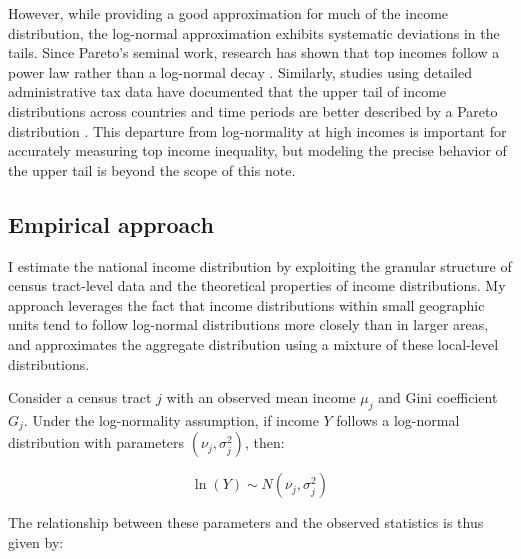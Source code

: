 However, while providing a good approximation for much of the income distribution, the log-normal approximation exhibits systematic deviations in the tails. Since Pareto's \citeyearpar{pareto1896cours} seminal work, research has shown that top incomes follow a power law rather than a log-normal decay \citep{gabaix2016power}. Similarly, studies using detailed administrative tax data have documented that the upper tail of income distributions across countries and time periods are better described by a Pareto distribution \citep{atkinson2011top}. This departure from log-normality at high incomes is important for accurately measuring top income inequality, but modeling the precise behavior of the upper tail is beyond the scope of this note.



\subsection{Empirical approach}

I estimate the national income distribution by exploiting the granular structure of census tract-level data and the theoretical properties of income distributions. My approach leverages the fact that income distributions within small geographic units tend to follow log-normal distributions more closely than in larger areas, and approximates the aggregate distribution using a mixture of these local-level distributions.

Consider a census tract $j$ with an observed mean income $\mu_j$ and Gini coefficient $G_j$. Under the log-normality assumption, if income $Y$ follows a log-normal distribution with parameters $(\nu_j, \sigma_j^2)$, then:

\begin{equation}
\ln(Y) \sim N(\nu_j, \sigma_j^2)
\end{equation}

The relationship between these parameters and the observed statistics is thus given by:

